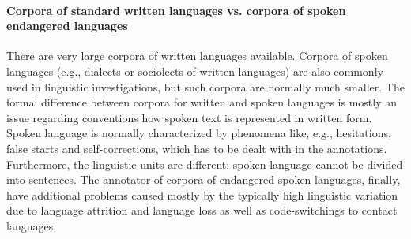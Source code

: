 \documentclass[a4paper,12pt]{article}
\begin{document}

\paragraph{Corpora of standard written languages vs. corpora of spoken endangered languages} 
There are very large corpora of written languages available. Corpora of spoken languages (e.g., dialects or sociolects of written languages) are also commonly used in linguistic investigations, but such corpora are normally much smaller. The formal difference between corpora for written and spoken languages is mostly an issue regarding conventions how spoken text is represented in written form. Spoken language is normally characterized by phenomena like, e.g., hesitations, false starts and self-corrections, which has to be dealt with in the annotations. Furthermore, the linguistic units are different: spoken language cannot be divided into sentences. The annotator of corpora of endangered spoken languages, finally, have additional problems caused mostly by the typically high linguistic variation due to language attrition and language loss as well as code-switchings to contact languages.
\end{document}
